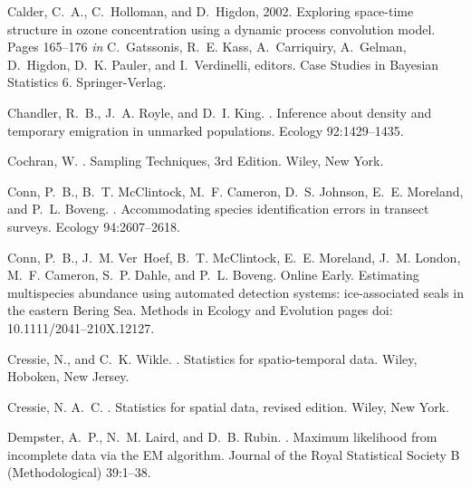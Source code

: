 \documentclass[12pt,english]{article}
\begin{document}
\begin{spacing}{1.9}
\begin{thebibliography}{59}
Calder, C.~A., C.~Holloman, and D.~Higdon, 2002.
\newblock Exploring space-time structure in ozone concentration using a dynamic
  process convolution model.
\newblock Pages 165--176 {\em in\/} C.~Gatssonis, R.~E. Kass, A.~Carriquiry,
  A.~Gelman, D.~Higdon, D.~K. Pauler, and I.~Verdinelli, editors. Case Studies
  in Bayesian Statistics 6. Springer-Verlag.

Chandler, R.~B., J.~A. Royle, and D.~I. King.
.
\newblock Inference about density and temporary emigration in unmarked
  populations.
\newblock Ecology { 92}:1429--1435.

Cochran, W.
.
\newblock Sampling Techniques, 3rd Edition.
\newblock Wiley, New York.

Conn, P.~B., B.~T. McClintock, M.~F. Cameron, D.~S. Johnson, E.~E. Moreland,
  and P.~L. Boveng.
.
\newblock Accommodating species identification errors in transect surveys.
\newblock Ecology { 94}:2607--2618.

Conn, P.~B., J.~M. Ver~Hoef, B.~T. McClintock, E.~E. Moreland, J.~M. London,
  M.~F. Cameron, S.~P. Dahle, and P.~L. Boveng.
\newblock Online Early.
\newblock Estimating multispecies abundance using automated detection systems:
  ice-associated seals in the eastern {B}ering {S}ea.
\newblock Methods in Ecology and Evolution pages doi: 10.1111/2041--210X.12127.

Cressie, N., and C.~K. Wikle.
.
\newblock Statistics for spatio-temporal data.
\newblock Wiley, Hoboken, New Jersey.

Cressie, N. A.~C.
.
\newblock Statistics for spatial data, revised edition.
\newblock Wiley, New York.

Dempster, A.~P., N.~M. Laird, and D.~B. Rubin.
.
\newblock Maximum likelihood from incomplete data via the EM algorithm.
\newblock Journal of the Royal Statistical Society B (Methodological) {
  39}:1--38.


\end{thebibliography}
\end{spacing}
\end{document}
